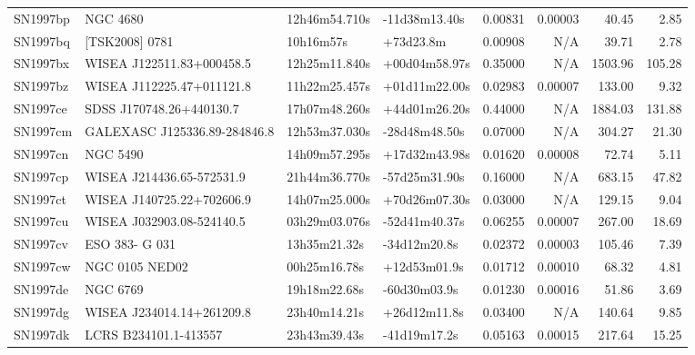 \begin{longtable}{llllrrrr}
SN1997bp         &                        NGC 4680 &   12h46m54.710s &   -11d38m13.40s &  0.00831 &  0.00003 &    40.45 &        2.85 \\
SN1997bq         &                  [TSK2008] 0781 &       10h16m57s &       +73d23.8m &  0.00908 &      N/A &    39.71 &        2.78 \\
SN1997bx         &       WISEA J122511.83+000458.5 &   12h25m11.840s &   +00d04m58.97s &  0.35000 &      N/A &  1503.96 &      105.28 \\
SN1997bz         &       WISEA J112225.47+011121.8 &   11h22m25.457s &   +01d11m22.00s &  0.02983 &  0.00007 &   133.00 &        9.32 \\
SN1997ce         &        SDSS J170748.26+440130.7 &   17h07m48.260s &   +44d01m26.20s &  0.44000 &      N/A &  1884.03 &      131.88 \\
SN1997cm         &  GALEXASC J125336.89-284846.8   &   12h53m37.030s &   -28d48m48.50s &  0.07000 &      N/A &   304.27 &       21.30 \\
SN1997cn         &                        NGC 5490 &   14h09m57.295s &   +17d32m43.98s &  0.01620 &  0.00008 &    72.74 &        5.11 \\
SN1997cp         &       WISEA J214436.65-572531.9 &   21h44m36.770s &   -57d25m31.90s &  0.16000 &      N/A &   683.15 &       47.82 \\
SN1997ct         &       WISEA J140725.22+702606.9 &   14h07m25.000s &   +70d26m07.30s &  0.03000 &      N/A &   129.15 &        9.04 \\
SN1997cu         &       WISEA J032903.08-524140.5 &   03h29m03.076s &   -52d41m40.37s &  0.06255 &  0.00007 &   267.00 &       18.69 \\
SN1997cv         &                  ESO 383- G 031 &    13h35m21.32s &    -34d12m20.8s &  0.02372 &  0.00003 &   105.46 &        7.39 \\
SN1997cw         &                  NGC 0105 NED02 &    00h25m16.78s &    +12d53m01.9s &  0.01712 &  0.00010 &    68.32 &        4.81 \\
SN1997de         &                        NGC 6769 &    19h18m22.68s &    -60d30m03.9s &  0.01230 &  0.00016 &    51.86 &        3.69 \\
SN1997dg         &       WISEA J234014.14+261209.8 &    23h40m14.21s &    +26d12m11.8s &  0.03400 &      N/A &   140.64 &        9.85 \\
SN1997dk         &           LCRS B234101.1-413557 &    23h43m39.43s &    -41d19m17.2s &  0.05163 &  0.00015 &   217.64 &       15.25 \\

\end{longtable}
